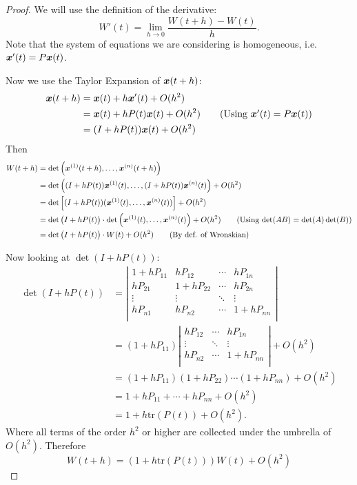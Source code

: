 \begin{proof}
	We will use the definition of the derivative:
	\begin{equation}\label{eq:abelproof}
		W'(t) = \lim_{h\to 0} \frac{W(t+h) - W(t)}{h}.
	\end{equation}
	Note that the system of equations we are considering is homogeneous, i.e. $\bm{x}'(t) = P\bm{x}(t)$.
	
	Now we use the Taylor Expansion of $\bm{x}(t+h)$:
	\begin{align*}
		\vbx(t+h) &= \xt + h\xtp + O(h^2) \\
		&= \xt + hP(t)\xt + O(h^2) \tag{Using $\xtp = P\xt$} \\
		&= (I + hP(t))\xt + O(h^2)
	\end{align*}
	Then
	\begin{align*}
		W(t+h) &= \det\left(\bm{x}^{(1)}(t+h), \ldots, \bm{x}^{(n)}(t+h)\right) \\
		&= \det\left((I + hP(t))\bm{x}^{(1)}(t), \ldots, (I + hP(t))\bm{x}^{(n)}(t)\right) + O(h^2) \\
		&= \det\left[(I+hP(t))(\bm{x}^{(1)}(t), \ldots, \bm{x}^{(n)}(t))\right] + O(h^2) \\
		&= \det\left(I+hP(t)\right) \cdot \det\left(\bm{x}^{(1)}(t), \ldots, \bm{x}^{(n)}(t)\right) + O(h^2) \tag{Using $\det(AB) = \det(A)\det(B)$} \\
		&= \det\left(I+hP(t)\right) \cdot W(t) + O(h^2) \tag{By def. of Wronskian}
	\end{align*}
	
	Now looking at $\det\left(I+hP(t)\right)$:
	\begin{align*}
		\det\left(I+hP(t)\right) &= \left|\begin{array}{cccc}1+hP_{11} & hP_{12} & \cdots & hP_{1n} \\ hP_{21} & 1+hP_{22} & \cdots & hP_{2n} \\ \vdots & \vdots & \ddots & \vdots \\ hP_{n1} & hP_{n2} & \cdots & 1+hP_{nn} \\\end{array}\right| \\
		&= (1+hP_{11})\left|\begin{array}{cccc}hP_{12} & \cdots & hP_{1n} \\ \vdots & \ddots & \vdots \\hP_{n2} & \cdots & 1+hP_{nn} \\\end{array}\right| + O(h^2) \\
		&= (1+hP_{11})(1+hP_{22})\cdots (1+hP_{nn}) + O(h^2) \\
		&= 1 + hP_{11} + \cdots + hP_{nn} + O(h^2) \\
		&= 1 + h \text{tr}(P(t)) + O(h^2).
	\end{align*}
	Where all terms of the order $h^2$ or higher are collected under the umbrella of $O(h^2)$. Therefore
	\[
	W(t+h) = (1 + h \text{tr}(P(t))) W(t) + O(h^2)
	\]
	

\end{proof}
